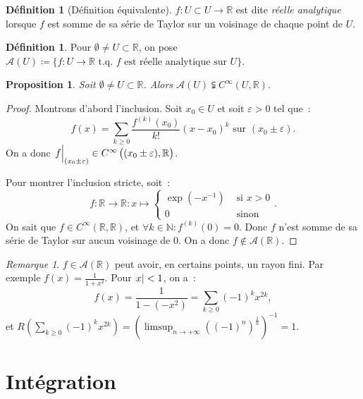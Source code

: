 \documentclass{report}
\newtheorem{prp}[thm]{Proposition}
\theoremstyle{definition}
\newtheorem{déf}[thm]{Définition}
\theoremstyle{remark}
\newtheorem*{rmq}{Remarque}
\numberwithin{equation}{section}
\newcommand{\R}{\mathbb R}
\newcommand{\N}{\mathbb N}
\newcommand{\tq}{\text{ t.q. }}
\newcommand{\restr}[2]{\left.#1\vphantom{\big|}\right|_{#2}}
\newcommand{\pinfty}{{+\infty}}
\begin{document}
			\begin{déf}[Définition équivalente] $f : U \subset U \to \R$ est dite \textit{réelle analytique} lorsque $f$ est somme de sa série de Taylor sur un
			voisinage de chaque point de $U$.
			\end{déf}

			\begin{déf} Pour $\emptyset \neq U \subset \R$, on pose $\mathcal A(U) \coloneqq \{f : U \to \R \tq f \text{ est réelle analytique sur } U\}$.
			\end{déf}

			\begin{prp} Soit $\emptyset \neq U \subset \R$. Alors $\mathcal A(U) \subsetneqq C^\infty(U, \R)$.
			\end{prp}

			\begin{proof} Montrons d'abord l'inclusion. Soit $x_0 \in U$ et soit $\varepsilon > 0$ tel que~:
			\begin{equation}
				f(x) = \sum_{k \geq 0}\frac {f^{(k)}(x_0)}{k!}(x-x_0)^k \text{ sur } (x_0 \pm \varepsilon).
			\end{equation}
			On a donc $\restr f {(x_0 \pm \varepsilon)} \in C^\infty\left((x_0 \pm \varepsilon), \R\right)$.

			Pour montrer l'inclusion stricte, soit~:
			\begin{equation}
				f : \R \to \R : x \mapsto \begin{cases}\exp(-x^{-1}) &\text{ si } x > 0 \\0 &\text{ sinon}\end{cases}.
			\end{equation}
			On sait que $f \in C^\infty(\R, \R)$, et $\forall k \in \N : f^{(k)}(0) = 0$. Donc $f$ n'est somme de sa série de Taylor sur aucun voisinage de $0$.
			On a donc $f \not \in \mathcal A(\R)$.
			\end{proof}

			\begin{rmq} $f \in \mathcal A(\R)$ peut avoir, en certains points, un rayon fini. Par exemple $f(x) = \frac 1{1 + x^2}$. Pour $\abs x < 1$, on a~:
			\begin{equation}
				f(x) = \frac 1{1 - (-x^2)} = \sum_{k \geq 0}(-1)^kx^{2k},
			\end{equation}
			et $R\left(\sum_{k \geq 0}(-1)^kx^{2k}\right) = \left(\limsup_{n \to \pinfty}((-1)^n)^{\frac 1n}\right)^{-1} = 1$.
			\end{rmq}

\chapter{Intégration}
\end{document}
